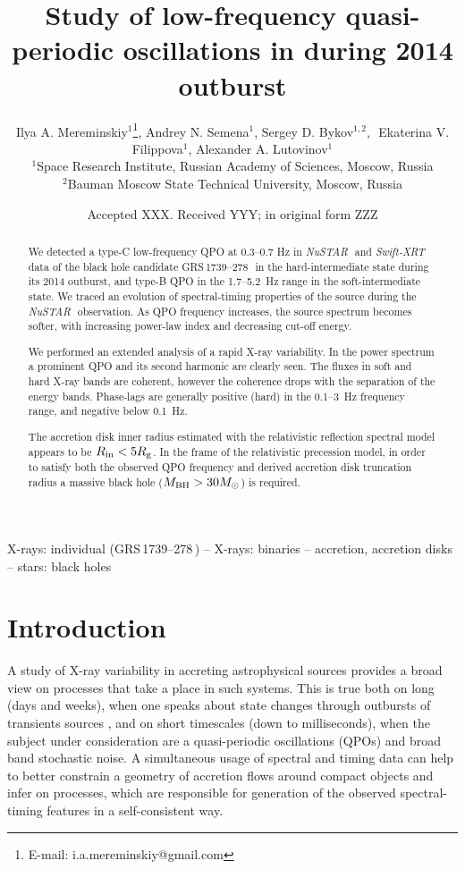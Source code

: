 \documentclass[a4paper,fleqn,usenatbib]{mnras}
\title[Low-frequency QPOs in  \grs]{Study of low-frequency quasi-periodic oscillations in \grs during 2014 outburst}
\author[I. A. Mereminskiy et al.]{
Ilya A. Mereminskiy$^{1}$\thanks{E-mail: i.a.mereminskiy@gmail.com},
Andrey N. Semena$^{1}$,
Sergey D. Bykov$^{1,2}$, \newauthor
\,\,Ekaterina V. Filippova$^{1}$,
Alexander A. Lutovinov$^{1}$
\\
$^{1}$Space Research Institute, Russian Academy of Sciences, Moscow, Russia\\
$^{2}$Bauman Moscow State Technical University, Moscow, Russia\\
}
\date{Accepted XXX. Received YYY; in original form ZZZ}
\def\grs{{GRS\,1739--278\,}}
\def\swiftx{{\em Swift-XRT\,}}
\def\nustar{{\em NuSTAR\,}}
\begin{document}
\label{firstpage}
\pagerange{\pageref{firstpage}--\pageref{lastpage}}
\maketitle

\begin{abstract}
We detected a type-C low-frequency QPO at 0.3--0.7 Hz in \nustar\, and \swiftx\, data of the black hole candidate \grs\, in the hard-intermediate state during its 2014 outburst, and type-B QPO in the 1.7--5.2~Hz range in the soft-intermediate state. We traced an evolution of spectral-timing properties of the source during the \nustar\, observation. 
As QPO frequency increases, the source spectrum becomes softer, with increasing power-law index and decreasing cut-off energy.

We performed an extended analysis of a rapid X-ray variability. In the power spectrum a prominent QPO and its second harmonic are clearly seen. 
The fluxes in soft and hard X-ray bands are coherent, however the coherence drops with the separation of the energy bands. 
Phase-lags are generally positive (hard) in the 0.1--3~Hz frequency range, and negative below 0.1~Hz.


The accretion disk inner radius estimated with the relativistic reflection spectral model appears to be $R_{\rm in} < 5R_{\rm g}$.
In the frame of the relativistic precession model, in order to satisfy both the observed QPO frequency and derived accretion disk truncation radius a massive black hole ($M_{\rm BH} > 30M_\odot$) is required.
\end{abstract}

\begin{keywords}
X-rays: individual (\grs) -- X-rays: binaries -- accretion, accretion disks  -- stars: black holes
\end{keywords}


\section{Introduction}
\label{sec:intro} 
A study of X-ray variability in accreting astrophysical sources provides a broad view on processes that take a place in such systems. 
This is true both on long (days and weeks), when one speaks about state changes through outbursts of transients sources \citep[see e.g.][]{homan05, heil15}, and on short timescales (down to milliseconds), when the subject under consideration are a quasi-periodic oscillations (QPOs) and broad band stochastic noise. 
A simultaneous usage of spectral and timing data can help to better constrain a geometry of accretion flows around compact objects and infer on processes, which are responsible for generation of the observed spectral-timing features in a self-consistent way.
\end{document}
